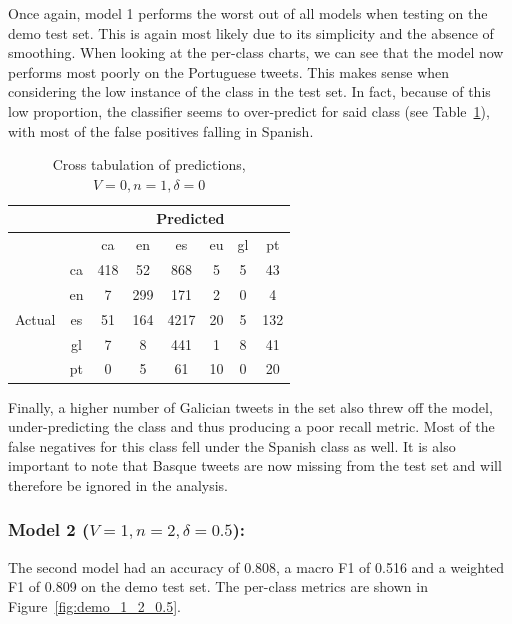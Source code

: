 \documentclass[runningheads]{llncs}
\begin{document}
Once again, model 1 performs the worst out of all models when testing on the demo test set. This is again most likely due to its simplicity and the absence of smoothing. When looking at the per-class charts, we can see that the model now performs most poorly on the Portuguese tweets. This makes sense when considering the low instance of the class in the test set. In fact, because of this low proportion, the classifier seems to over-predict for said class (see Table~\ref{tab:demo_confusion_0_1_0}), with most of the false positives falling in Spanish. \\

\begin{table}
	\centering
	\caption{Cross tabulation of predictions, $V=0, n=1, \delta=0$}
	\label{tab:demo_confusion_0_1_0}
	\begin{tabular}{|c|c|c|c|c|c|c|c|} \hline
        & & \multicolumn{6}{c|}{Predicted} \\ \hline
		& &    ca &   en &    es &  eu &   gl &   pt \\ \hline
		\multirow{6}{*}{Actual} & ca   &  418 &   52 &   868 &   5 &   5 &   43 \\
		& en   &    7 &  299 &   171 &   2 &   0 &    4 \\
		& es   &   51 &  164 &  4217 &  20 &   5 &  132 \\
		& gl   &    7 &    8 &   441 &   1 &   8 &   41 \\
		& pt   &    0 &    5 &    61 &  10 &   0 &   20 \\ \hline
		\end{tabular}
\end{table}

Finally, a higher number of Galician tweets in the set also threw off the model, under-predicting the class and thus producing a poor recall metric. Most of the false negatives for this class fell under the Spanish class as well. It is also important to note that Basque tweets are now missing from the test set and will therefore be ignored in the analysis.

\subsubsection{Model 2 ($V=1, n=2, \delta=0.5$): }
The second model had an accuracy of 0.808, a macro F1 of 0.516 and a weighted F1 of 0.809 on the demo test set. The per-class metrics are shown in Figure~\ref{fig:demo_1_2_0.5}.
\end{document}
